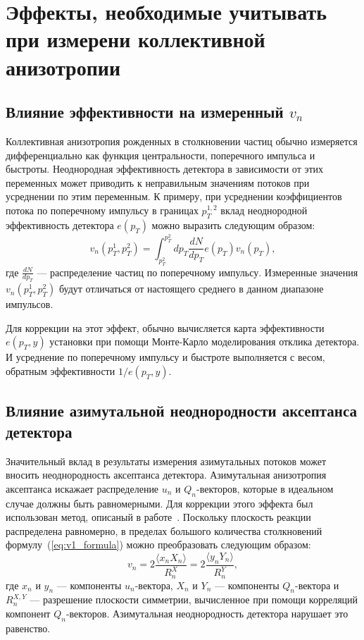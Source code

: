 \section{Эффекты, необходимые учитывать при измерени коллективной анизотропии}

\subsection{Влияние эффективности на измеренный $v_n$}

Коллективная анизотропия рожденных в столкновении частиц обычно измеряется дифференциально как функция центральности, поперечного импульса и быстроты.
Неоднородная эффективность детектора в зависимости от этих переменных может приводить к неправильным значениям потоков при усреднении по этим переменным.
К примеру, при усреднении коэффициентов потока по поперечному импульсу в границах $p_T^{1,2}$ вклад неоднородной эффективность детектора $e(p_T)$ можно выразить следующим образом:
\begin{equation}
    v_n(p_T^1, p_T^2) = \int_{p_T^2}^{p_T^2} dp_T \frac{dN}{dp_T} e(p_T) v_n(p_T),
\end{equation}
где $\frac{dN}{dp_T}$ --- распределение частиц по поперечному импульсу.
Измеренные значения $v_n(p_T^1, p_T^2)$ будут отличаться от настоящего среднего в данном диапазоне импульсов.

Для коррекции на этот эффект, обычно вычисляется карта эффективности $e(p_T, y)$ установки при помощи Монте-Карло моделирования отклика детектора.
И усреднение по поперечному импульсу и быстроте выполняется с весом, обратным эффективности $1/e(p_T, y)$.

\subsection{Влияние азимутальной неоднородности аксептанса детектора}

Значительный вклад в результаты измерения азимутальных потоков может вносить неоднородность аксептанса детектора. 
Азимутальная анизотропия аксептанса искажает распределение $u_n$  и $Q_n$-векторов, которые в идеальном случае должны быть равномерными. 
Для коррекции этого эффекта был использован метод, описаный в работе~\cite{Selyuzhenkov:2007zi}.
Поскольку плоскость реакции распределена равномерно, в пределах большого количества столкновений формулу~(\ref{eq:v1_formula}) можно преобразовать следующим образом:
%
\begin{equation}
    v_n =  2\frac{ \langle x_n X_n \rangle }{R_n^X} = 2\frac{ \langle y_n Y_n \rangle }{R_n^Y},
    \label{eq:v1_formula}
\end{equation}
%
где $x_n$ и $y_n$ --- компоненты $u_n$-вектора, $X_n$ и $Y_n$ --- компоненты $Q_n$-вектора и $R_n^{X,Y}$ --- разрешение плоскости симметрии, вычисленное при помощи корреляций компонент $Q_n$-векторов.
Азимутальная неоднородность детектора нарушает это равенство.

